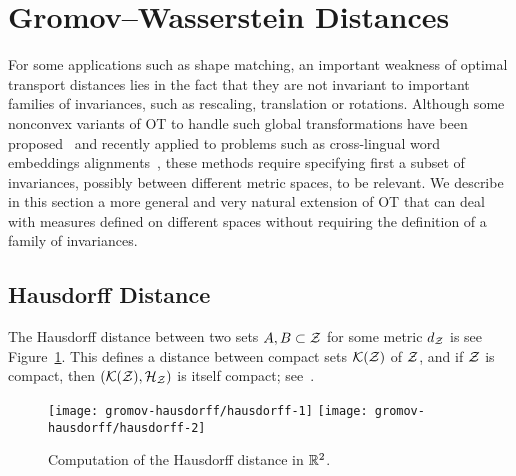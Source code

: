 \section{Gromov--Wasserstein Distances}

For some applications such as shape matching, an important weakness of optimal transport distances lies in the fact that they are not invariant to important families of invariances, such as rescaling, translation or rotations. Although some nonconvex variants of OT to handle such global transformations have been proposed~\citep{cohen1999earth,pele2013tangent} and recently applied to problems such as cross-lingual word embeddings alignments~\citep{grave2018unsupervised,alvarez2018towards,grave2018unsupervised}, these methods require specifying first a subset of invariances, possibly between different metric spaces, to be relevant. We describe in this section a more general and very natural extension of OT that can deal with measures defined on different spaces without requiring the definition of a family of invariances.

\subsection{Hausdorff Distance}
\label{sec-hausdorff}

The Hausdorff distance between two sets $A,B \subset \mathcal{Z}$ for some metric $d_{\mathcal{Z}}$ is 
see Figure~\ref{fig-hausdorff}.
%
This defines a distance between compact sets $\mathcal{K}(\mathcal{Z})$ of $\mathcal{Z}$, and if $\mathcal{Z}$ is compact, then $(\mathcal{K}(\mathcal{Z}),\mathcal{H}_{\mathcal{Z}})$ is itself compact; see~\citep{burago2001course}.

\begin{figure}[h!]
\centering
\texttt{[image: gromov-hausdorff/hausdorff-1]}
\qquad
\texttt{[image: gromov-hausdorff/hausdorff-2]}
\caption{\label{fig-hausdorff}
Computation of the Hausdorff distance in $\mathbb{R}^2$. 
}
\end{figure}

